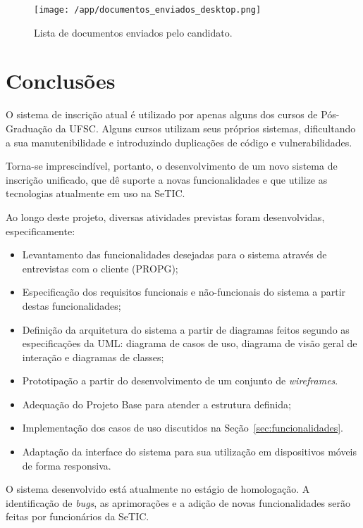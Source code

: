 \documentclass[
  10.5pt,				  %
	openright,			%
	twoside,			  %
  a5paper,
  chapter=TITLE,	%
	section=TITLE,	%
  hyphens,        %
	english,        %
	brazil          %
]{abntex2}
\begin{document}
\begin{figure}[!ht]
  \caption{\label{fig:documentos_enviados} Lista de documentos enviados pelo candidato.}
  \begin{center}
    \texttt{[image: /app/documentos\_enviados\_desktop.png]}
  \end{center}
\end{figure}



\chapter{Conclusões}

O sistema de inscrição atual é utilizado por apenas alguns dos cursos de Pós-Graduação da UFSC. Alguns cursos utilizam seus próprios sistemas, dificultando a sua manutenibilidade e introduzindo duplicações de código e vulnerabilidades.

Torna-se imprescindível, portanto, o desenvolvimento de um novo sistema de inscrição unificado, que dê suporte a novas funcionalidades e que utilize as tecnologias atualmente em uso na SeTIC.

Ao longo deste projeto, diversas atividades previstas foram desenvolvidas, especificamente:
\begin{itemize}
  \item Levantamento das funcionalidades desejadas para o sistema através de entrevistas com o cliente (PROPG);
  \item Especificação dos requisitos funcionais e não-funcionais do sistema a partir destas funcionalidades;
  \item Definição da arquitetura do sistema a partir de diagramas feitos segundo as especificações da UML: diagrama de casos de uso, diagrama de visão geral de interação e diagramas de classes;
  \item Prototipação a partir do desenvolvimento de um conjunto de \emph{wireframes}.
  \item Adequação do Projeto Base para atender a estrutura definida;
  \item Implementação dos casos de uso discutidos na Seção~\ref{sec:funcionalidades}.
  \item Adaptação da interface do sistema para sua utilização em dispositivos móveis de forma responsiva.
\end{itemize}

O sistema desenvolvido está atualmente no estágio de homologação. A identificação de \emph{bugs}, as aprimorações e a adição de novas funcionalidades serão feitas por funcionários da SeTIC.
\end{document}
